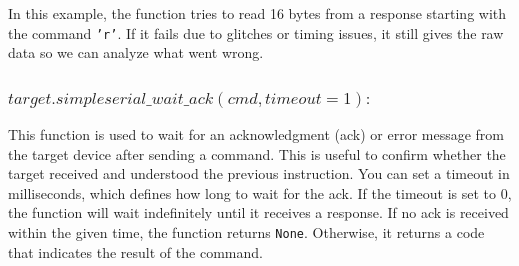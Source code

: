 In this example, the function tries to read 16 bytes from a response starting with the command \texttt{'r'}. If it fails due to glitches or timing issues, it still gives the raw data so we can analyze what went wrong.

\subsubsection{$target.simpleserial\_wait\_ack(cmd, timeout=1) :$}
This function is used to wait for an acknowledgment (ack) or error message from the target device after sending a command. This is useful to confirm whether the target received and understood the previous instruction. You can set a timeout in milliseconds, which defines how long to wait for the ack. If the timeout is set to 0, the function will wait indefinitely until it receives a response. If no ack is received within the given time, the function returns \texttt{None}. Otherwise, it returns a code that indicates the result of the command.

